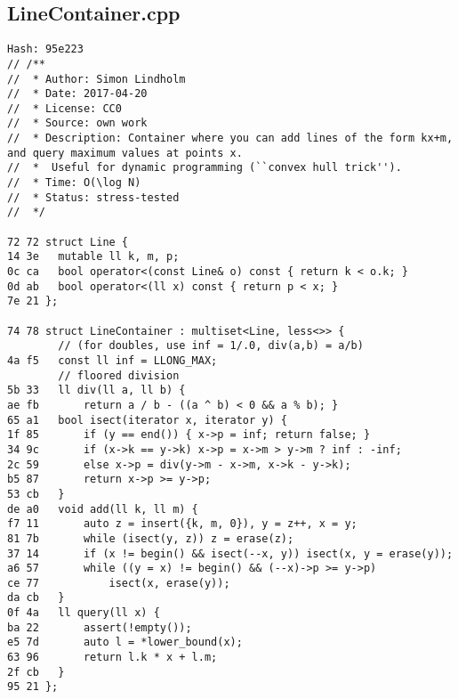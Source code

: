 \documentclass[11pt, a4paper, twoside]{article}
\begin{document}
\subsection{LineContainer.cpp}
\begin{lstlisting}
Hash: 95e223
// /**
//  * Author: Simon Lindholm
//  * Date: 2017-04-20
//  * License: CC0
//  * Source: own work
//  * Description: Container where you can add lines of the form kx+m, and query maximum values at points x.
//  *  Useful for dynamic programming (``convex hull trick'').
//  * Time: O(\log N)
//  * Status: stress-tested
//  */

72 72 struct Line {
14 3e 	mutable ll k, m, p;
0c ca 	bool operator<(const Line& o) const { return k < o.k; }
0d ab 	bool operator<(ll x) const { return p < x; }
7e 21 };

74 78 struct LineContainer : multiset<Line, less<>> {
      	// (for doubles, use inf = 1/.0, div(a,b) = a/b)
4a f5 	const ll inf = LLONG_MAX;
      	// floored division
5b 33 	ll div(ll a, ll b) { 
ae fb 		return a / b - ((a ^ b) < 0 && a % b); }
65 a1 	bool isect(iterator x, iterator y) {
1f 85 		if (y == end()) { x->p = inf; return false; }
34 9c 		if (x->k == y->k) x->p = x->m > y->m ? inf : -inf;
2c 59 		else x->p = div(y->m - x->m, x->k - y->k);
b5 87 		return x->p >= y->p;
53 cb 	}
de a0 	void add(ll k, ll m) {
f7 11 		auto z = insert({k, m, 0}), y = z++, x = y;
81 7b 		while (isect(y, z)) z = erase(z);
37 14 		if (x != begin() && isect(--x, y)) isect(x, y = erase(y));
a6 57 		while ((y = x) != begin() && (--x)->p >= y->p)
ce 77 			isect(x, erase(y));
da cb 	}
0f 4a 	ll query(ll x) {
ba 22 		assert(!empty());
e5 7d 		auto l = *lower_bound(x);
63 96 		return l.k * x + l.m;
2f cb 	}
95 21 };
\end{lstlisting}
\end{document}
